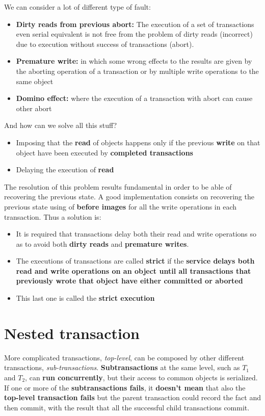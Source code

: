 We can consider a lot of different type of fault:
\begin{itemize}
    \item \textbf{Dirty reads from previous abort:} The execution of a set of transactions even serial equivalent is not free from the problem of dirty reads (incorrect) due to execution without success of transactions (abort).
    \item \textbf{Premature write:} in which some wrong effects to the results are given by the aborting operation of a transaction or by multiple write operations to the same object
    \item \textbf{Domino effect:} where the execution of a transaction with abort can cause other abort
\end{itemize}
And how can we solve all this stuff?
\begin{itemize}
    \item  Imposing that the \textbf{read} of objects happens only if the previous \textbf{write} on that object have been executed by \textbf{completed transactions}
    \item Delaying the execution of \textbf{read}
\end{itemize}
The resolution of this problem results fundamental in order to be able of recovering the previous state. A good implementation consists on recovering the previous state using of \textbf{before images} for all the write operations in each transaction. Thus a solution is:
\begin{itemize}
    \item  It is required that transactions delay both their read and write operations so as to avoid both \textbf{dirty reads} and \textbf{premature writes}.
    \item The executions of transactions are called \textbf{strict} if the \textbf{service delays both read and write operations on an object until all transactions that previously wrote that object have either committed or aborted}
    \item This last one is called the \textbf{strict execution}
\end{itemize}

\section{Nested transaction}
More complicated transactions, \textit{top-level}, can be composed by other different transactions, \textit{sub-transactions}. \textbf{Subtransactions} at the same level, such as \(T_1\) and \(T_2\), can \textbf{run concurrently}, but their access to common objects is serialized. If one or more of the \textbf{subtransactions fails}, it \textbf{doesn’t mean} that also the \textbf{top-level transaction fails} but the parent transaction could record the fact and then commit, with the result that all the successful child transactions commit.

